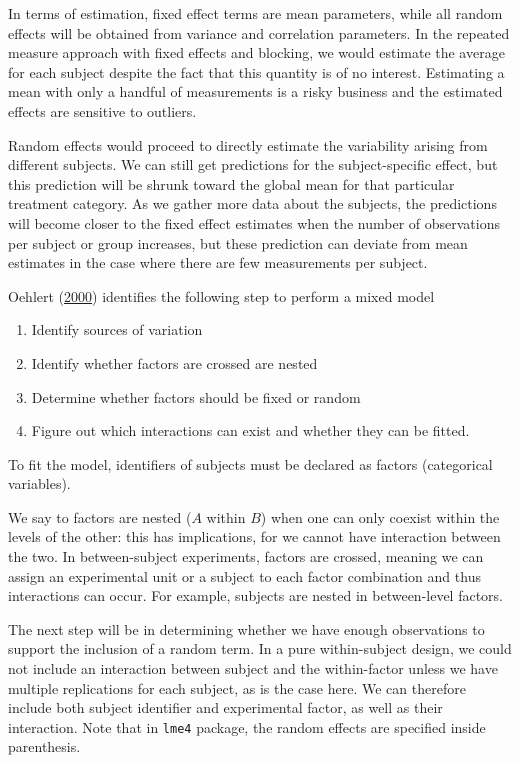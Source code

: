 \documentclass[
  11pt,
  letterpaper,
]{scrbook}
\providecommand{\tightlist}{%
  \setlength{\itemsep}{0pt}\setlength{\parskip}{0pt}}\usepackage{longtable,booktabs,array}
\theoremstyle{definition}
\theoremstyle{remark}
\begin{document}
In terms of estimation, fixed effect terms are mean parameters, while
all random effects will be obtained from variance and correlation
parameters. In the repeated measure approach with fixed effects and
blocking, we would estimate the average for each subject despite the
fact that this quantity is of no interest. Estimating a mean with only a
handful of measurements is a risky business and the estimated effects
are sensitive to outliers.

Random effects would proceed to directly estimate the variability
arising from different subjects. We can still get predictions for the
subject-specific effect, but this prediction will be shrunk toward the
global mean for that particular treatment category. As we gather more
data about the subjects, the predictions will become closer to the fixed
effect estimates when the number of observations per subject or group
increases, but these prediction can deviate from mean estimates in the
case where there are few measurements per subject.

Oehlert (\protect\hyperlink{ref-Oehlert:2010}{2000}) identifies the
following step to perform a mixed model

\begin{enumerate}
\def\labelenumi{\arabic{enumi}.}
\tightlist
\item
  Identify sources of variation
\item
  Identify whether factors are crossed are nested
\item
  Determine whether factors should be fixed or random
\item
  Figure out which interactions can exist and whether they can be
  fitted.
\end{enumerate}

To fit the model, identifiers of subjects must be declared as factors
(categorical variables).

We say to factors are nested (\(A\) within \(B\)) when one can only
coexist within the levels of the other: this has implications, for we
cannot have interaction between the two. In between-subject experiments,
factors are crossed, meaning we can assign an experimental unit or a
subject to each factor combination and thus interactions can occur. For
example, subjects are nested in between-level factors.

The next step will be in determining whether we have enough observations
to support the inclusion of a random term. In a pure within-subject
design, we could not include an interaction between subject and the
within-factor unless we have multiple replications for each subject, as
is the case here. We can therefore include both subject identifier and
experimental factor, as well as their interaction. Note that in
\texttt{lme4} package, the random effects are specified inside
parenthesis.
\end{document}
